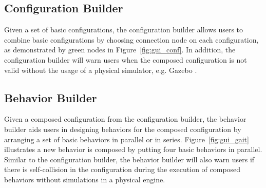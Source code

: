\documentclass[conference]{IEEEtran}
\theoremstyle{definition}
\begin{document}
\subsection{Configuration Builder}
Given a set of basic configurations, the configuration builder allows users to combine basic configurations by choosing connection node on each configuration, as demonstrated by green nodes in Figure~\ref{fig:gui_conf}. In addition, the configuration builder will warn users when the composed configuration is not valid without the usage of a physical simulator, e.g. Gazebo
\cite{koenig2004design}.

\subsection{Behavior Builder}
Given a composed configuration from the configuration builder, the behavior builder aids users in designing behaviors for the composed configuration by arranging a set of basic behaviors in parallel or in series. Figure~\ref{fig:gui_gait} illustrates a new behavior is composed by putting four basic behaviors in parallel. Similar to the configuration builder, the behavior builder will also warn users if there is self-collision in the configuration during the execution of composed behaviors without simulations in a physical engine.
\end{document}

